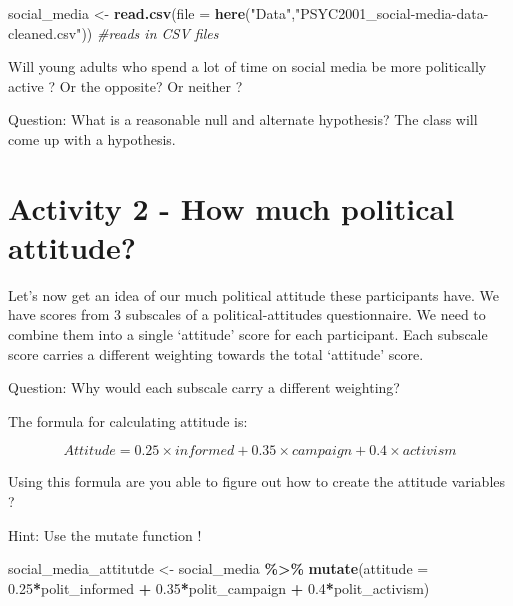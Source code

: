 \documentclass[
]{book}
\newenvironment{Shaded}{\begin{snugshade}}{\end{snugshade}}
\newcommand{\AttributeTok}[1]{\textcolor[rgb]{0.13,0.29,0.53}{#1}}
\newcommand{\CommentTok}[1]{\textcolor[rgb]{0.56,0.35,0.01}{\textit{#1}}}
\newcommand{\FloatTok}[1]{\textcolor[rgb]{0.00,0.00,0.81}{#1}}
\newcommand{\FunctionTok}[1]{\textcolor[rgb]{0.13,0.29,0.53}{\textbf{#1}}}
\newcommand{\NormalTok}[1]{#1}
\newcommand{\OtherTok}[1]{\textcolor[rgb]{0.56,0.35,0.01}{#1}}
\newcommand{\SpecialCharTok}[1]{\textcolor[rgb]{0.81,0.36,0.00}{\textbf{#1}}}
\newcommand{\StringTok}[1]{\textcolor[rgb]{0.31,0.60,0.02}{#1}}
\begin{document}
\begin{Shaded}
\begin{Highlighting}[]
\NormalTok{social\_media }\OtherTok{\textless{}{-}} \FunctionTok{read.csv}\NormalTok{(}\AttributeTok{file =} \FunctionTok{here}\NormalTok{(}\StringTok{"Data"}\NormalTok{,}\StringTok{"PSYC2001\_social{-}media{-}data{-}cleaned.csv"}\NormalTok{)) }\CommentTok{\#reads in CSV files}
\end{Highlighting}
\end{Shaded}

Will young adults who spend a lot of time on social media be more politically active ? Or the opposite? Or neither ?

Question: What is a reasonable null and alternate hypothesis? The class will come up with a hypothesis.

\section{Activity 2 - How much political attitude?}\label{activity-2---how-much-political-attitude}

Let's now get an idea of our much political attitude these participants have. We have scores from 3 subscales of a political-attitudes questionnaire. We need to combine them into a single `attitude' score for each participant. Each subscale score carries a different weighting towards the total `attitude' score.

Question: Why would each subscale carry a different weighting?

The formula for calculating attitude is:

\[Attitude = 0.25 \times informed + 0.35 \times campaign + 0.4 \times activism\]

Using this formula are you able to figure out how to create the attitude variables ?

Hint: Use the mutate function !

\begin{Shaded}
\begin{Highlighting}[]
\NormalTok{social\_media\_attitutde }\OtherTok{\textless{}{-}}\NormalTok{ social\_media }\SpecialCharTok{\%\textgreater{}\%} 
  \FunctionTok{mutate}\NormalTok{(}\AttributeTok{attitude =} \FloatTok{0.25}\SpecialCharTok{*}\NormalTok{polit\_informed }\SpecialCharTok{+}
                    \FloatTok{0.35}\SpecialCharTok{*}\NormalTok{polit\_campaign }\SpecialCharTok{+}
                    \FloatTok{0.4}\SpecialCharTok{*}\NormalTok{polit\_activism)}
\end{Highlighting}
\end{Shaded}
\end{document}
